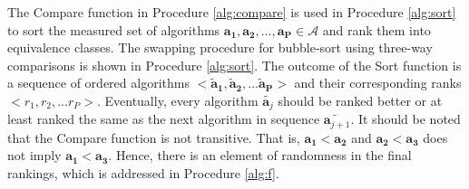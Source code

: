 \documentclass[conference]{IEEEtran}
\newcommand{\p}[1]{{\color{blue} Pdj: #1}}
\begin{document}
The Compare function in Procedure \ref{alg:compare} is used in Procedure \ref{alg:sort} to sort the measured set of algorithms $\mathbf{a_1},\mathbf{a_2}, ..., \mathbf{a_P} \in \mathcal{A}$
and rank them into equivalence classes. The swapping procedure for bubble-sort using three-way comparisons is shown in
Procedure \ref{alg:sort}.
The outcome of the Sort function is a sequence of ordered algorithms $<\mathbf{\tilde{a}_1}, \mathbf{\tilde{a}_2}, ... \mathbf{\tilde{a}_P}>$ and their corresponding ranks $ <r_1,r_2,...r_P> $. Eventually, every algorithm $\tilde{\mathbf{a}_j}$ should be ranked better or at least ranked the same as the next algorithm in sequence $\tilde{\mathbf{a}_{j+1}}$.  It should be noted that the Compare function is not transitive. That is,  $\mathbf{a_1} < \mathbf{a_2}$ and $\mathbf{a_2} < \mathbf{a_3} $ does not imply $\mathbf{a_1} < \mathbf{a_3}$. Hence, there is an element of randomness in the final rankings, which is addressed in Procedure \ref{alg:f}. 



\end{document}
